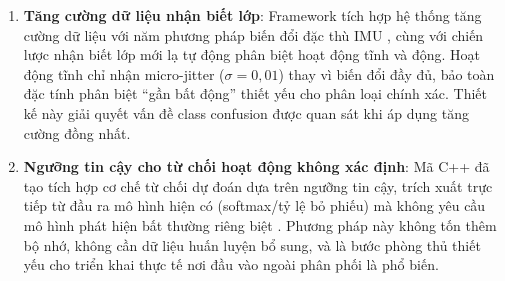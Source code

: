 \begin{enumerate}
    \item \textbf{Tăng cường dữ liệu nhận biết lớp}: Framework tích hợp hệ thống tăng cường dữ liệu với năm phương pháp biến đổi đặc thù IMU \cite{um2017data}, cùng với chiến lược nhận biết lớp mới lạ tự động phân biệt hoạt động tĩnh và động. Hoạt động tĩnh chỉ nhận micro-jitter ($\sigma = 0{,}01$) thay vì biến đổi đầy đủ, bảo toàn đặc tính phân biệt ``gần bất động'' thiết yếu cho phân loại chính xác. Thiết kế này giải quyết vấn đề class confusion được quan sát khi áp dụng tăng cường đồng nhất.

    \item \textbf{Ngưỡng tin cậy cho từ chối hoạt động không xác định}: Mã C++ đã tạo tích hợp cơ chế từ chối dự đoán dựa trên ngưỡng tin cậy, trích xuất trực tiếp từ đầu ra mô hình hiện có (softmax/tỷ lệ bỏ phiếu) mà không yêu cầu mô hình phát hiện bất thường riêng biệt \cite{hendrycks2017baseline}. Phương pháp này không tốn thêm bộ nhớ, không cần dữ liệu huấn luyện bổ sung, và là bước phòng thủ thiết yếu cho triển khai thực tế nơi đầu vào ngoài phân phối là phổ biến.
\end{enumerate}

